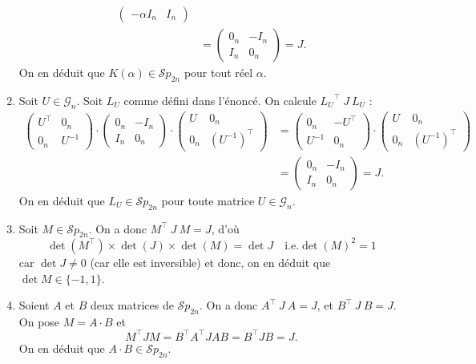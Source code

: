 \documentclass[a4paper]{article}
\begin{document}
\begin{enumerate}
\begin{align*}
\begin{pmatrix}
					-\alpha I_n & I_n
				\end{pmatrix}\\ &= \begin{pmatrix}
					0_n & -I_n\\
					I_n & 0_n
				\end{pmatrix} = J
			.\end{align*}
			On en déduit que $K(\alpha) \in \mathcal{S}p_{2n}$\/ pour tout réel $\alpha$.
		\item Soit $U \in \mathcal{G}_n$. Soit $L_U$\/ comme défini dans l'énoncé. On calcule ${L_U}^\top\:J\:L_U$ :
			\begin{align*}
				\begin{pmatrix}
					U^\top &0_n\\
					0_n&U^{-1}
				\end{pmatrix}\cdot \begin{pmatrix}
					0_n&-I_n\\
					I_n&0_n
				\end{pmatrix} \cdot \begin{pmatrix}
					U&0_n\\
					0_n&(U^{-1})^\top
				\end{pmatrix} &= \begin{pmatrix}
					0_n&-U^\top\\
					U^{-1}&0_n
				\end{pmatrix} \cdot \begin{pmatrix}
					U&0_n\\
					0_n&(U^{-1})^\top 
				\end{pmatrix}\\
				&= \begin{pmatrix}
					0_n&-I_n\\
					I_n&0_n
				\end{pmatrix} = J
			.\end{align*}
			On en déduit que $L_U \in \mathcal{S}p_{2n}$\/ pour toute matrice $U \in \mathcal{G}_n$.
		\item Soit $M \in \mathcal{S}p_{2n}$. On a donc $M^\top\:J\:M = J$, d'où \[
				\det(M^\top) \times \det(J) \times \det(M) = \det J \quad\text{i.e.} \det(M)^2 = 1
			\] car $\det J \neq 0$\/ (car elle est inversible) et donc, on en déduit que $\det M \in \{-1,1\}$.
		\item Soient $A$\/ et $B$\/ deux matrices de $\mathcal{S}p_{2n}$. On a donc $A^\top \:J\:A = J$, et $B^\top\:J\:B = J$. On pose $M = A \cdot B$\/ et \[
				M^\top J M = B^\top A^\top J A B = B^\top J B = J
			.\] On en déduit que $A \cdot B \in \mathcal{S}p_{2n}$.

\end{enumerate}
\end{document}
